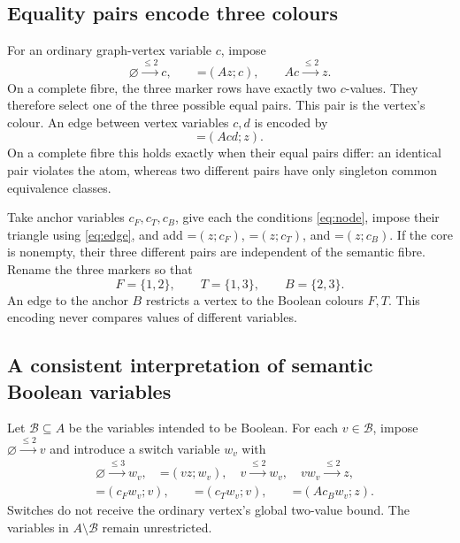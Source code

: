 \documentclass[11pt,a4paper]{article}
\newcommand{\dep}[2]{\mathord{=}(#1;#2)}
\newcommand{\ND}[3]{#1\xrightarrow{\leq #3}#2}
\theoremstyle{definition}
\begin{document}
\subsection{Equality pairs encode three colours}
For an ordinary graph-vertex variable $c$, impose
\begin{equation}
 \ND\varnothing c2,\qquad \dep{Az}c,\qquad \ND{Ac}z2.
 \label{eq:node}
\end{equation}
On a complete fibre, the three marker rows have exactly two $c$-values.
They therefore select one of the three possible equal pairs. This pair
is the vertex's colour. An edge between vertex variables $c,d$ is
encoded by
\begin{equation}
 \dep{Acd}z.
 \label{eq:edge}
\end{equation}
On a complete fibre this holds exactly when their equal pairs differ:
an identical pair violates the atom, whereas two different pairs have
only singleton common equivalence classes.

Take anchor variables $c_F,c_T,c_B$, give each the conditions
\eqref{eq:node}, impose their triangle using \eqref{eq:edge}, and add
$\dep z{c_F}$, $\dep z{c_T}$, and $\dep z{c_B}$.
If the core is nonempty, their three different pairs are independent
of the semantic fibre. Rename the three markers so that
\[
 F=\{1,2\},\qquad T=\{1,3\},\qquad B=\{2,3\}.
\]
An edge to the anchor $B$ restricts a vertex to the Boolean colours
$F,T$. This encoding never compares values of different variables.

\subsection{A consistent interpretation of semantic Boolean variables}
Let $\mathcal B\subseteq A$ be the variables intended to be Boolean.
For each $v\in\mathcal B$, impose $\ND\varnothing v2$ and introduce
a switch variable $w_v$ with
\begin{align}
 &\ND\varnothing{w_v}3,\quad \dep{vz}{w_v},\quad
   \ND v{w_v}2,\quad \ND{v w_v}z2,\label{eq:switch-a}\\
 &\dep{c_Fw_v}v,\qquad \dep{c_Tw_v}v,\qquad
   \dep{A c_Bw_v}z.\label{eq:switch-b}
\end{align}
Switches do not receive the ordinary vertex's global two-value bound.
The variables in $A\setminus\mathcal B$ remain unrestricted.
\end{document}
